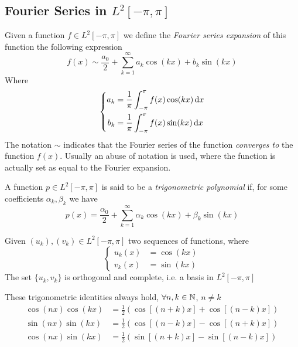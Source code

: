 \documentclass[../complete.tex]{subfiles}
\begin{document}
\subsection{Fourier Series in $L^2[-\pi,\pi]$}
\begin{dfn}
	Given a function $f\in L^2[-\pi,\pi]$ we define the \textit{Fourier series expansion} of this function the following expression
	\begin{equation}
		f(x)\sim\frac{a_0}{2}+\sum_{k=1}^{\infty}a_k\cos(kx)+b_k\sin(kx)
		\label{eq:fourierseries}
	\end{equation}
	Where
	\begin{equation}
		\left\{\begin{aligned}
				a_k&=\frac{1}{\pi}\int_{-\pi}^{\pi}f(x)\cos(kx)\operatorname{d\!} x\\
				b_k&=\frac{1}{\pi}\int_{-\pi}^{\pi}f(x)\sin(kx)\operatorname{d\!} x
		\end{aligned}\right.
		\label{eq:fouriercoeff}
	\end{equation}
	The notation $\sim$ indicates that the Fourier series of the function \textit{converges to} the function $f(x)$. Usually an abuse of notation is used, where the function is actually set as equal to the Fourier expansion.
\end{dfn}
\begin{dfn}
	A function $p\in L^2[-\pi,\pi]$ is said to be a \textit{trigonometric polynomial} if, for some coefficients $\alpha_k,\beta_k$ we have
	\begin{equation}
		p(x)=\frac{\alpha_0}{2}+\sum_{k=1}^{\infty}\alpha_k\cos(kx)+\beta_k\sin(kx)
		\label{eq:trigpolyn}
	\end{equation}
\end{dfn}
\begin{thm}
	Given $(u_k),(v_k)\in L^2[-\pi,\pi]$ two sequences of functions, where
	\begin{equation*}
		\left\{\begin{aligned}
				u_k(x)&=\cos(kx)\\
				v_k(x)&=\sin(kx)
		\end{aligned}\right.
	\end{equation*}
	The set $\{u_k,v_k\}$ is orthogonal and complete, i.e. a basis in $L^2[-\pi,\pi]$
\end{thm}
\begin{rmk}
	These trigonometric identities always hold, $\forall n,k\in\mathbb{N}$, $n\ne k$
	\begin{equation}
		\begin{aligned}
			\cos(nx)\cos(kx)&=\frac{1}{2}\left( \cos[(n+k)x]+\cos[(n-k)x] \right)\\
			\sin(nx)\sin(kx)&=\frac{1}{2}\left( \cos[(n-k)x]-\cos[(n+k)x] \right)\\
			\cos(nx)\sin(kx)&=\frac{1}{2}\left( \sin[(n+k)x]-\sin[(n-k)x] \right)
		\end{aligned}
		\label{eq:trigidentities2rmk}
	\end{equation}
\end{rmk}
\end{document}
